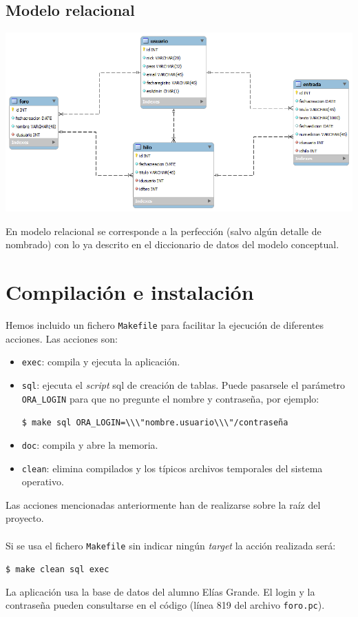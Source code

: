 \documentclass[12pt, a4paper, titlepage]{article}
\begin{document}
\subsection{Modelo relacional}

\includegraphics[width=15cm]{./img/relacional.png}

En modelo relacional se corresponde a la perfección (salvo algún detalle de nombrado) con lo ya descrito en el diccionario de datos del modelo conceptual.

\section{Compilación e instalación}
Hemos incluido un fichero \texttt{Makefile} para facilitar la ejecución de diferentes acciones. Las acciones son:
\begin{itemize}
	\item \texttt{exec}: compila y ejecuta la aplicación.
	\item \texttt{sql}: ejecuta el \textit{script} sql de creación de tablas. Puede pasarsele el parámetro \texttt{ORA\_LOGIN} para que no pregunte el nombre y contraseña, por ejemplo:
	\begin{center}
	\lstinline[language={}]{$ make sql ORA_LOGIN=\\\"nombre.usuario\\\"/contraseña}
	\end{center}
	\item \texttt{doc}: compila y abre la memoria.
	\item \texttt{clean}: elimina compilados y los típicos archivos temporales del sistema operativo.
\end{itemize}
Las acciones mencionadas anteriormente han de realizarse sobre la raíz del proyecto.
\paragraph{}
Si se usa el fichero \texttt{Makefile} sin indicar ningún \textit{target} la acción realizada será:
	\begin{center}
	\lstinline[language={}]{$ make clean sql exec}
	\end{center}
La aplicación usa la base de datos del alumno Elías Grande. El login y la contraseña pueden consultarse en el código (línea 819 del archivo \texttt{foro.pc}).
\end{document}
